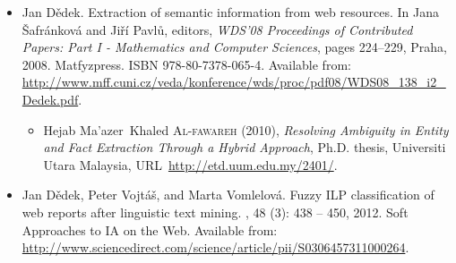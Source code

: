 \documentclass[12pt,a4paper,oneside,notitlepage]{article}
\newcommand{\urlprefix}{URL~}
\begin{document}
\begin{itemize}
\begin{itemize}
\item
Laurie \textsc{Serrano}, Maroua \textsc{Bouzid}, Thierry \textsc{Charnois}, and
  Bruno \textsc{Grilheres} (2012), Vers un syst{\`e}me de capitalisation des
  connaissances: extraction d'{\'e}v{\'e}nements par combinaison de plusieurs
  approches., in \emph{{Workshop SOS-DLWD'2012: From Open Sources to Web of
  Data, at EGC'2012}}, pp. 49--61, Bordeaux,
  \urlprefix\url{https://www.greyc.fr/sites/default/files/users/serranol/Extraction_d_evenements_par_combinaison_de_plusieurs_approches.pdf}.
\end{itemize}




\item
Jan D{\v{e}}dek.
\newblock Extraction of semantic information from web resources.
\newblock In Jana {\v{S}}afr{\'{a}}nkov{\'{a}} and Ji{\v{r}}{\'{i}}
  Pavl{\r{u}}, editors, {\em {WDS}'08 Proceedings of Contributed Papers: Part I
  - Mathematics and Computer Sciences}, pages 224--229, Praha, 2008.
  Matfyzpress.
\newblock ISBN 978-80-7378-065-4.
\newblock Available from:
  \url{http://www.mff.cuni.cz/veda/konference/wds/proc/pdf08/WDS08_138_i2_Dedek.pdf}.

\begin{itemize}
\item
Hejab Ma'azer~Khaled \textsc{Al-fawareh} (2010), \emph{Resolving Ambiguity in
  Entity and Fact Extraction Through a Hybrid Approach}, Ph.D. thesis,
  Universiti Utara Malaysia, \urlprefix\url{http://etd.uum.edu.my/2401/}.
\end{itemize}


\item
Jan D{\v{e}}dek, Peter Vojt{\'{a}}{\v{s}}, and Marta Vomlelov{\'{a}}.
\newblock Fuzzy {ILP} classification of web reports after linguistic text
  mining.
, 48 (3):
  438 -- 450, 2012.
\newblock Soft Approaches to IA on the Web.
\newblock Available from:
  \url{http://www.sciencedirect.com/science/article/pii/S0306457311000264}.


\end{itemize}
\end{document}
